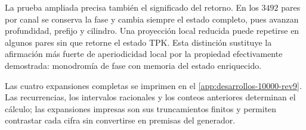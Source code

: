 La prueba ampliada precisa también el significado del retorno. En los
\(3492\) pares por canal se conserva la fase y cambia siempre el estado
completo, pues avanzan profundidad, prefijo y cilindro. Una proyección local
reducida puede repetirse en algunos pares sin que retorne el estado TPK. Esta
distinción sustituye la afirmación más fuerte de aperiodicidad local por la
propiedad efectivamente demostrada: monodromía de fase con memoria del estado
enriquecido.

Las cuatro expansiones completas se imprimen en el
\cref{app:desarrollos-10000-rev9}. Las recurrencias, los intervalos
racionales y los conteos anteriores determinan el cálculo; las expansiones
impresas son sus truncamientos finitos y permiten contrastar cada cifra sin
convertirse en premisas del generador.
